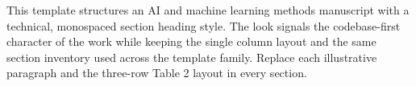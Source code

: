 
This template structures an AI and machine learning methods manuscript with a technical, monospaced section heading style. The look signals the codebase-first character of the work while keeping the single column layout and the same section inventory used across the template family. Replace each illustrative paragraph and the three-row Table 2 layout in every section.
